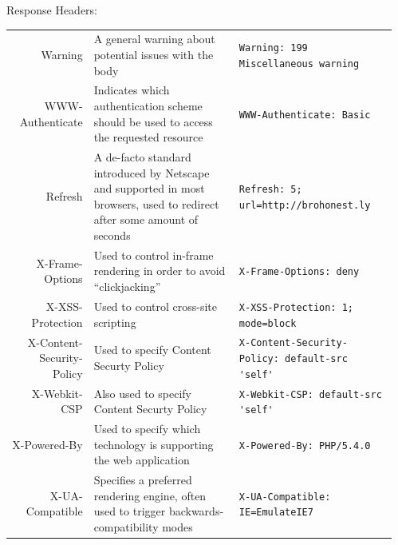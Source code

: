 \documentclass[final]{beamer}
\newcommand{\header}[1]{\texttt{\lstinline!#1!}}
\begin{document}
\begin{frame}{}
\begin{columns}
\begin{column}{0.4\textwidth}
\begin{block}{\huge{Response Headers:}}
\begin{tabular}{r p{} p{}}
            Warning & A general warning about potential issues with the body & \header{Warning: 199 Miscellaneous warning } \\
            WWW-Authenticate & Indicates which authentication scheme should be used to access the requested resource & \header{WWW-Authenticate: Basic } \\ \hline
            Refresh & A de-facto standard introduced by Netscape and supported in most browsers, used to redirect after some amount of seconds & \header{Refresh: 5; url=http://brohonest.ly } \\
            X-Frame-Options & Used to control in-frame rendering in order to avoid ``clickjacking'' & \header{X-Frame-Options: deny } \\
            X-XSS-Protection & Used to control cross-site scripting & \header{X-XSS-Protection: 1; mode=block } \\
            X-Content-Security-Policy & Used to specify Content Securty Policy & \header{X-Content-Security-Policy: default-src 'self' } \\
            X-Webkit-CSP & Also used to specify Content Securty Policy & \header{X-Webkit-CSP: default-src 'self' } \\
            X-Powered-By & Used to specify which technology is supporting the web application & \header{X-Powered-By: PHP/5.4.0 } \\
            X-UA-Compatible & Specifies a preferred rendering engine, often used to trigger backwards-compatibility modes & \header{X-UA-Compatible: IE=EmulateIE7 } \\
          \end{tabular}

        \end{block}
      \end{column}
      \begin{column}{0.1\textwidth}
      \end{column}
    \end{columns}
  \end{frame}
\end{document}

